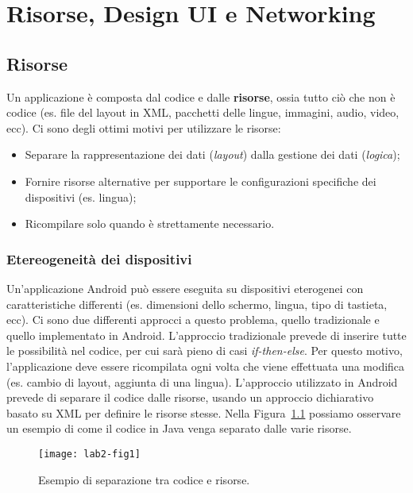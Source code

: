 \chapter{Risorse, Design UI e Networking}

\section{Risorse}

Un applicazione è composta dal codice e dalle \textbf{risorse}, ossia tutto ciò che non è codice (es. file del layout in XML, pacchetti delle lingue, immagini, audio, video, ecc).
Ci sono degli ottimi motivi per utilizzare le risorse:

\begin{itemize}
\item Separare la rappresentazione dei dati (\textit{layout}) dalla gestione dei dati (\textit{logica});
\item Fornire risorse alternative per supportare le configurazioni specifiche dei dispositivi (es. lingua);
\item Ricompilare solo quando è strettamente necessario. 
\end{itemize}

\subsection{Etereogeneità dei dispositivi}

Un'applicazione Android può essere eseguita su dispositivi eterogenei con caratteristiche differenti (es. dimensioni dello schermo, lingua, tipo di tastieta, ecc). Ci sono due differenti approcci a questo problema, quello tradizionale e quello implementato in Android.
L'approccio tradizionale prevede di inserire tutte le possibilità nel codice, per cui sarà pieno di casi \emph{if-then-else}. Per questo motivo, l'applicazione deve essere ricompilata ogni volta che viene effettuata una modifica (es. cambio di layout, aggiunta di una lingua).
L'approccio utilizzato in Android prevede di separare il codice dalle risorse, usando un approccio dichiarativo basato su XML per definire le risorse stesse. Nella Figura~\ref{img:lab2-fig1} possiamo osservare un esempio di come il codice in Java venga separato dalle varie risorse.

\begin{figure}[htbp]
	\centering
	\texttt{[image: lab2-fig1]}
	\caption[Esempio di separazione tra codice e risorse]{Esempio di separazione tra codice e risorse.}\label{img:lab2-fig1}
\end{figure}

